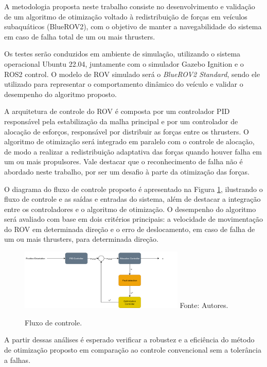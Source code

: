 \documentclass[../main.tex]{subfiles}
\begin{document}
A metodologia proposta neste trabalho consiste no desenvolvimento e validação de um algoritmo de otimização voltado à redistribuição de forças em veículos subaquáticos (BlueROV2), com o objetivo de manter a navegabilidade do sistema em caso de falha total de um ou mais thrusters.

Os testes serão conduzidos em ambiente de simulação, utilizando o sistema operacional Ubuntu 22.04, juntamente com o simulador Gazebo Ignition e o ROS2 control. O modelo de ROV simulado será o \textit{BlueROV2 Standard}, sendo ele utilizado para representar o comportamento dinâmico do veículo e validar o desempenho do algoritmo proposto.

A arquitetura de controle do ROV é composta por um controlador PID responsável pela estabilização da malha principal e por um controlador de alocação de esforços, responsável por distribuir as forças entre os thrusters. O algoritmo de otimização será integrado em paralelo com o controle de alocação, de modo a realizar a redistribuição adaptativa das forças quando houver falha em um ou mais propulsores. Vale destacar que o reconhecimento de falha não é abordado neste trabalho, por ser um desafio à parte da otimização das forças.

O diagrama do fluxo de controle proposto é apresentado na Figura \ref{control_logic}, ilustrando o fluxo de controle e as saídas e entradas do sistema, além de destacar a integração entre os controladores e o algoritmo de otimização. O desempenho do algoritmo será avaliado com base em dois critérios principais: a velocidade de movimentação do ROV em determinada direção e o erro de deslocamento, em caso de falha de um ou mais thrusters, para determinada direção.

\begin{figure}[H]
  \centering
  \caption{Fluxo de controle.}
  \includegraphics[width=0.7\textwidth]{images/control_logic.drawio.png}
  \vfill
  Fonte: Autores.
  \label{control_logic}
\end{figure}

A partir dessas análises é esperado verificar a robustez e a eficiência do método de otimização proposto em comparação ao controle convencional sem a tolerância a falhas.
\end{document}
